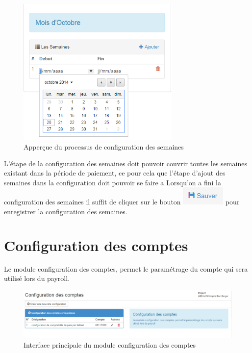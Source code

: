 \documentclass[12pt,a4paper]{report}
\begin{document}
\begin{figure}[h]
\begin{center}
\includegraphics[width=8cm]{pic/SelectWeek.png}
\end{center}
\caption{Apperçue du processus de configuration des semaines}
\label{Apperçue du processus de configuration des semaines}
\end{figure}

L'étape de la configuration des semaines doit pouvoir couvrir toutes les semaines existant dans la période de paiement, ce pour cela que l'étape d'ajout des semaines dans la configuration doit pouvoir se faire a
Lorsqu'on a fini la configuration des semaines il suffit de cliquer sur le bouton \includegraphics[scale=0.7]{pic/SaveConfig.png} pour enregistrer la configuration des semaines.

\section{Configuration des comptes}
Le module configuration des comptes, permet le paramétrage du compte qui sera utilisé lors du payroll.
\begin{figure}[h]
\begin{center}
\includegraphics[width=14cm]{pic/ConfigCompteUnit.png}
\end{center}
\caption{Interface principale du module configuration des comptes}
\label{Interface principale du module configuration des comptes}
\end{figure}
\end{document}
